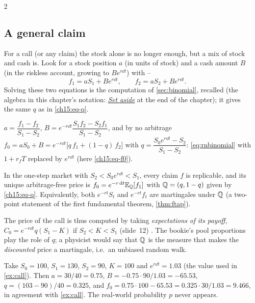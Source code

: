 \begin{paracol}{2}
\subsection{A general claim}\label{ch15:sec-claim1}
For a call (or any claim) the stock alone is no longer enough, but a mix of stock and cash is. Look for a stock position $a$ (in units of stock)
and a cash amount $B$ (in the riskless account, growing to $Be^{r\dd t}$) with --
\begin{equation}\label{ch15:eq-repl}
  f_1=aS_1+Be^{r\dd t},\qquad f_2=aS_2+Be^{r\dd t}.
\end{equation}
Solving these two equations is the computation of \cref{sec:binomial}, recalled \inmargin{} (the algebra in this chapter's notation: \hyperref[ch15:sec-setaside]{\emph{Set aside}} at the end of the chapter); it gives the same $q$ as in \eqref{ch15:eq-q}.
\begin{recall}
$a=\dfrac{f_1-f_2}{S_1-S_2}$, $B=e^{-r\dd t}\dfrac{S_1f_2-S_2f_1}{S_1-S_2}$, and by no arbitrage $f_0=aS_0+B=e^{-r\dd t}\bigl[q\,f_1+(1-q)\,f_2\bigr]$ with $q=\dfrac{S_0e^{r\dd t}-S_2}{S_1-S_2}$: \eqref{eq:rnbinomial} with $1+r_fT$ replaced by $e^{r\dd t}$ (here \eqref{ch15:eq-f0}).
\end{recall}

\begin{proposition}\label{ch15:prop-onestep}
In the one-step market with $S_2<S_0e^{r\dd t}<S_1$, every claim $f$ is replicable, and its unique arbitrage-free price is
$f_0=e^{-r\,\mathrm{d} t}\mathbb{E}_{\mathbb{Q}}[f_1]$ with $\mathbb{Q}=(q,1-q)$ given by \eqref{ch15:eq-q}. Equivalently, both $e^{-rt}S_t$ and $e^{-rt}f_t$ are martingales under $\mathbb{Q}$
(a two-point statement of the first fundamental theorem, \cref{thm:ftap}).
\end{proposition}
The price of the call is thus computed by taking \emph{expectations of its payoff}, $C_0=e^{-r\dd t}q(S_1-K)$ if $S_2<K<S_1$
(slide~12) . The bookie's pool proportions play the role of $q$; a physicist would say that $\mathbb{Q}$ is the measure that makes the
\emph{discounted} price a martingale, i.e.\ an unbiased random walk.

\begin{example}\label{ch15:ex-call1}
Take $S_0=100$, $S_1=130$, $S_2=90$, $K=100$ and $e^{r\dd t}=1.03$ (the value used in \cref{ex:call}). Then $a=30/40=0.75$,
$B=-0.75\cdot90/1.03=-65.53$, $q=(103-90)/40=0.325$, and $f_0=0.75\cdot100-65.53=0.325\cdot30/1.03=9.466$, in agreement with
\cref{ex:call}. The real-world probability $p$ never appears.
\end{example}


\end{paracol}
